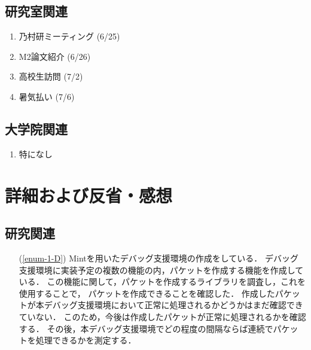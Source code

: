 \documentclass[fleqn, 14pt]{extarticle}
\begin{document}
\subsection{研究室関連}
\label{sec-2-2}
\begin{enumerate}

\item 乃村研ミーティング
\hfill
\label{enum-lab1}
(6/25)


\item M2論文紹介
\hfill
\label{enum-lab2}
(6/26)

\item 高校生訪問
\hfill
\label{enum-lab2}
(7/2)

\item 暑気払い 
\hfill
\label{enum-lab2}
(7/6)
\end{enumerate}

\subsection{大学院関連}
\label{sec2-3}
\begin{enumerate}

    \item 特になし
    \hfill
    \label{enum-univ2}

\end{enumerate}

\section{詳細および反省・感想}
\label{sec-3}
\subsection{研究関連}
\label{sec-3-2}
\begin{itemize}
\item[(\ref{enum-1-D})]
    Mintを用いたデバッグ支援環境の作成をしている．
    デバッグ支援環境に実装予定の複数の機能の内，パケットを作成する機能を作成している．
    この機能に関して，パケットを作成するライブラリを調査し，これを使用することで，
    パケットを作成できることを確認した．
    作成したパケットが本デバッグ支援環境において正常に処理されるかどうかはまだ確認できていない．
    このため，今後は作成したパケットが正常に処理されるかを確認する．
    その後，本デバッグ支援環境でどの程度の間隔ならば連続でパケットを処理できるかを測定する．

\end{itemize}
\end{document}

